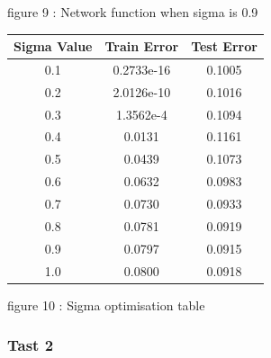 \documentclass{IEEEtran}
\begin{document}
\begin{flushleft}
\vspace{1.5mm}
{\footnotesize figure 9 : Network function when sigma is 0.9 }
\\
\vspace{1.5mm}
\end{flushleft}
\begin{center}
\begin{tabular}{||c c c||}
  \hline
Sigma Value & Train Error & Test Error \\ [0.5ex]
\hline
0.1 & 0.2733e-16 & 0.1005\\
0.2 & 2.0126e-10 & 0.1016\\
0.3 & 1.3562e-4 & 0.1094\\
0.4 & 0.0131 & 0.1161 \\
0.5 & 0.0439 & 0.1073 \\
0.6 & 0.0632 & 0.0983\\
0.7 & 0.0730 & 0.0933\\
0.8 & 0.0781 & 0.0919\\
0.9 & 0.0797 & 0.0915\\
1.0 & 0.0800 & 0.0918\\
\hline
\end{tabular}
\end{center}
\vspace{1.5mm}
{\footnotesize figure 10 : Sigma optimisation table }
\\
\vspace{1.5mm}
\subsubsection{Tast 2}
\end{document}
